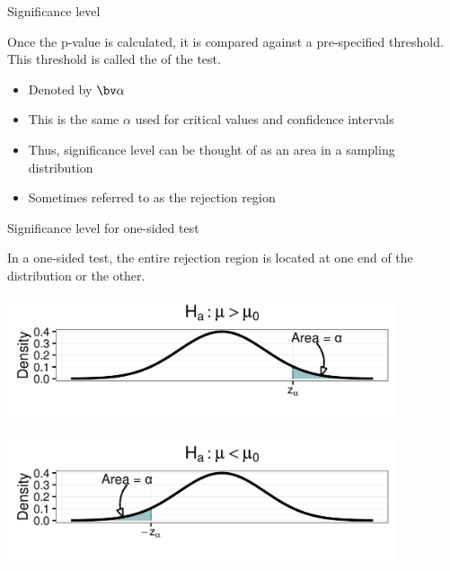 \documentclass[xcolor=table, handout]{beamer}
\begin{document}
\begin{frame}{Significance level}
\begin{block}{}
\large Once the p-value is calculated, it is compared against a pre-specified threshold. This threshold is called the  of the test.
\begin{itemize}
\pause\item Denoted by $\bv \alpha$
\pause\item This is the same $\alpha$ used for critical values and confidence intervals
\pause\item Thus, significance level can be thought of as an area in a sampling distribution
\pause\item Sometimes referred to as the rejection region
\end{itemize}
\end{block}
\end{frame}

\begin{frame}{Significance level for one-sided test}
\begin{block}{}
\large
In a one-sided test, the entire rejection region is located at one end of the distribution or the other.
\end{block}
{\centering
\includegraphics[width=4.5in]{../images/ch08_sig_up}
\par}
{\centering
\includegraphics[width=4.5in]{../images/ch08_sig_low}
\par}

\end{frame}
\end{document}
